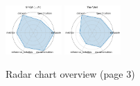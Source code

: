 \begin{figure}[ht!]
\includegraphics[width=0.1900\textwidth]{images/spiqa_llm_radar.pdf}
\includegraphics[width=0.1900\textwidth]{images/the_well_radar.pdf}
\caption{Radar chart overview (page 3)}
\end{figure}

